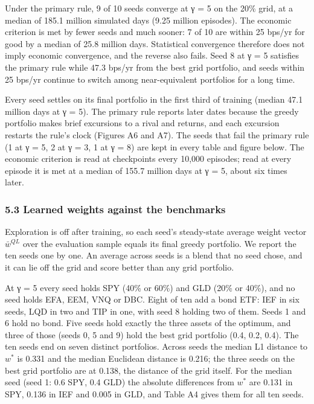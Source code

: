 \documentclass[
  11pt]{article}
\begin{document}
Under the primary rule, 9 of 10 seeds converge at γ = 5 on the 20\%
grid, at a median of 185.1 million simulated days (9.25 million
episodes). The economic criterion is met by fewer seeds and much sooner:
7 of 10 are within 25 bps/yr for good by a median of 25.8 million days.
Statistical convergence therefore does not imply economic convergence,
and the reverse also fails. Seed 8 at γ = 5 satisfies the primary rule
while 47.3 bps/yr from the best grid portfolio, and seeds within 25
bps/yr continue to switch among near-equivalent portfolios for a long
time.

Every seed settles on its final portfolio in the first third of training
(median 47.1 million days at γ = 5). The primary rule reports later
dates because the greedy portfolio makes brief excursions to a rival and
returns, and each excursion restarts the rule's clock (Figures A6 and
A7). The seeds that fail the primary rule (1 at γ = 5, 2 at γ = 3, 1 at
γ = 8) are kept in every table and figure below. The economic criterion
is read at checkpoints every 10,000 episodes; read at every episode it
is met at a median of 155.7 million days at γ = 5, about six times
later.

\subsubsection{5.3 Learned weights against the
benchmarks}\label{learned-weights-against-the-benchmarks}

Exploration is off after training, so each seed's steady-state average
weight vector \(\bar{w}^{QL}\) over the evaluation sample equals its
final greedy portfolio. We report the ten seeds one by one. An average
across seeds is a blend that no seed chose, and it can lie off the grid
and score better than any grid portfolio.

At γ = 5 every seed holds SPY (40\% or 60\%) and GLD (20\% or 40\%), and
no seed holds EFA, EEM, VNQ or DBC. Eight of ten add a bond ETF: IEF in
six seeds, LQD in two and TIP in one, with seed 8 holding two of them.
Seeds 1 and 6 hold no bond. Five seeds hold exactly the three assets of
the optimum, and three of those (seeds 0, 5 and 9) hold the best grid
portfolio (0.4, 0.2, 0.4). The ten seeds end on seven distinct
portfolios. Across seeds the median L1 distance to \(w^*\) is 0.331 and
the median Euclidean distance is 0.216; the three seeds on the best grid
portfolio are at 0.138, the distance of the grid itself. For the median
seed (seed 1: 0.6 SPY, 0.4 GLD) the absolute differences from \(w^*\)
are 0.131 in SPY, 0.136 in IEF and 0.005 in GLD, and Table A4 gives them
for all ten seeds.
\end{document}
